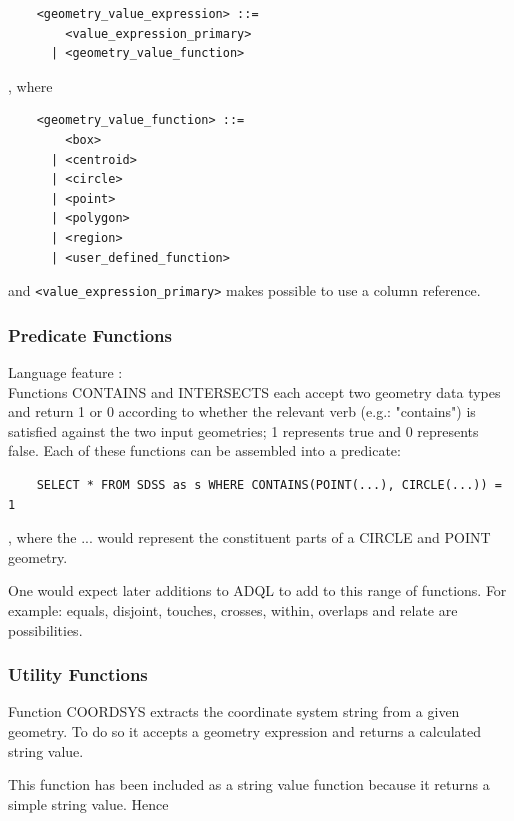 \documentclass[11pt,a4paper]{ivoa}
\begin{document}
\begin{verbatim}
    <geometry_value_expression> ::= 
        <value_expression_primary>
      | <geometry_value_function>
\end{verbatim}

, where

\begin{verbatim}
    <geometry_value_function> ::=
        <box>
      | <centroid>
      | <circle>
      | <point>
      | <polygon>
      | <region>
      | <user_defined_function>
\end{verbatim}

and \verb:<value_expression_primary>: makes possible to use a column reference.

\subsubsection{Predicate Functions}
\label{sec:geom.functions.predicate}
{\footnotesize Language feature :}\\

Functions CONTAINS and INTERSECTS each accept two geometry data types
and return 1 or 0 according to whether the relevant verb (e.g.: "contains") is
satisfied against the two input geometries; 1 represents true and 0 represents
false. Each of these functions can be assembled into a predicate:

\begin{verbatim}
    SELECT * FROM SDSS as s WHERE CONTAINS(POINT(...), CIRCLE(...)) = 1
\end{verbatim}

, where the ... would represent the constituent parts of a CIRCLE and POINT
geometry.

One would expect later additions to ADQL to add to this range of functions. For
example: equals, disjoint, touches, crosses, within, overlaps and relate
are possibilities.

\subsubsection{Utility Functions}
\label{sec:geom.functions.utility}

Function COORDSYS extracts the coordinate system string from a given
geometry. To do so it accepts a geometry expression and returns a calculated
string value.

This function has been included as a string value function because it
returns a simple string value. Hence
\end{document}
